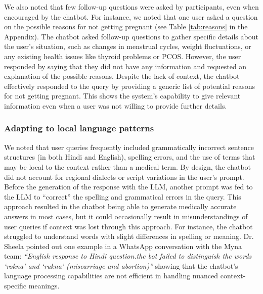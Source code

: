 We also noted that few follow-up questions were asked by participants, even when encouraged by the chatbot. For instance, we noted that one user asked a question on the possible reasons for not getting pregnant (see Table \ref{tab:reasons} in the Appendix). The chatbot asked follow-up questions to gather specific details about the user’s situation, such as changes in menstrual cycles, weight fluctuations, or any existing health issues like thyroid problems or PCOS. However, the user responded by saying that they did not have any information and requested an explanation of the possible reasons.
Despite the lack of context, the chatbot effectively responded to the query by providing a generic list of potential reasons for not getting pregnant. 
This shows the system's capability to give relevant information even when a user was not willing to provide further details. 

\subsubsection{Adapting to local language patterns}
We noted that user queries frequently included grammatically incorrect sentence structures (in both Hindi and English), spelling errors, and the use of terms that may be local to the context rather than a medical term.
By design, the chatbot did not account for regional dialects or script variations in the user's prompt. Before the generation of the response with the LLM, another prompt was fed to the LLM to ``correct'' the spelling and grammatical errors in the query.
This approach resulted in the chatbot being able to generate medically accurate answers in most cases, but it could occasionally result in misunderstandings of user queries if context was lost through this approach. For instance, the chatbot struggled to understand words with slight differences in spelling or meaning. Dr. Sheela pointed out one example in a WhatsApp conversation with the Myna team: \textit{``English response to Hindi question.the bot failed to distinguish the words `rokna' and `rukna' (miscarriage and abortion)''} showing that the chatbot's language processing capabilities are not efficient in handling nuanced context-specific meanings. %

